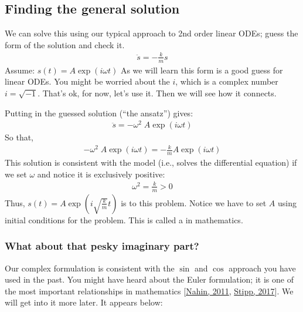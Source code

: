 \documentclass[letterpaper,10pt,english]{jupyterBook}
\begin{document}
\subsection{Finding the general solution}
\label{\detokenize{content/2_oscillations/readings-oscillators:finding-the-general-solution}}
\sphinxAtStartPar
We can solve this using our typical approach to 2nd order linear ODEs; guess the form of the solution and check it. 
\begin{equation*}
\begin{split}\ddot{s} = -\frac{k}{m}s\end{split}
\end{equation*}
\sphinxAtStartPar
Assume: \(s(t) = A\exp(i\omega t)\) As we will learn this form is a good guess for linear ODEs. You might be worried about the \(i\), which is a complex number \(i = \sqrt{-1}\). That’s ok, for now, let’s use it. Then we will see how it connects.

\sphinxAtStartPar
Putting in the guessed solution (“the ansatz”) gives:
\begin{equation*}
\begin{split}\ddot{s} = -\omega^2\;A\exp(i\omega t)\end{split}
\end{equation*}
\sphinxAtStartPar
So that,
\begin{equation*}
\begin{split}-\omega^2\;A\exp(i\omega t) = -\frac{k}{m}A\exp(i\omega t)\end{split}
\end{equation*}
\sphinxAtStartPar
This solution is consistent with the model (i.e., solves the differential equation) if we set \(\omega\) and notice it is exclusively positive:
\begin{equation*}
\begin{split}\omega^2 = \frac{k}{m} > 0\end{split}
\end{equation*}
\sphinxAtStartPar
Thus, \(s(t) = A\exp(i\sqrt{\frac{k}{m}} t)\) is  to this problem. Notice we have to set \(A\) using initial conditions for the problem. This is called a  in mathematics.


\subsubsection{What about that pesky imaginary part?}
\label{\detokenize{content/2_oscillations/readings-oscillators:what-about-that-pesky-imaginary-part}}
\sphinxAtStartPar
Our complex formulation is consistent with the \(\sin\) and \(\cos\) approach you have used in the past. You might have heard about the Euler formulation; it is one of the most important relationships in mathematics {[}\hyperlink{cite.content/X_additional_pages/references-page:id2}{Nahin, 2011}, \hyperlink{cite.content/X_additional_pages/references-page:id3}{Stipp, 2017}{]}. We will get into it more later. It appears below:
\end{document}
